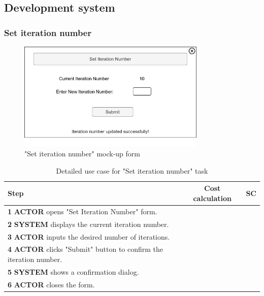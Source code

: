 \subsection{Development system}

\subsubsection{Set iteration number}

\begin{figure}[H]
\centering
\includegraphics[width=0.8\textwidth]{figures/set_iteration_number.png}
\caption{"Set iteration number" mock-up form}
\end{figure}

\begin{table}[H]
\centering
\begin{tabular}{|l|c|c|}
\hline
\textbf{Step} & \textbf{Cost calculation} & \textbf{SC} \\
\hline
\textbf{1} \textbf{ACTOR} opens "Set Iteration Number" form. & & \\
\hline
\textbf{2} \textbf{SYSTEM} displays the current iteration number. & & \\
\hline
\textbf{3} \textbf{ACTOR} inputs the desired number of iterations. & & \\
\hline
\textbf{4} \textbf{ACTOR} clicks "Submit" button to confirm the iteration number. & & \\
\hline
\textbf{5} \textbf{SYSTEM} shows a confirmation dialog. & & \\
\hline
\textbf{6} \textbf{ACTOR} closes the form. & & \\
\hline
\end{tabular}
\caption{Detailed use case for "Set iteration number" task}
\label{table:set_iteration_number}
\end{table}